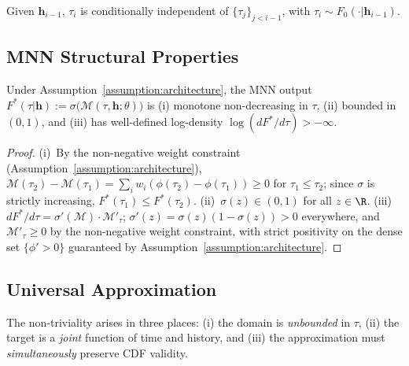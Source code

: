 \begin{assumption}
\label{assumption:conditional_independence}
Given $\boldsymbol{h}_{i-1}$, $\tau_i$ is conditionally independent of
$\{\tau_j\}_{j < i-1}$, with $\tau_i \sim F_0(\cdot|\boldsymbol{h}_{i-1})$.
\end{assumption}

\subsection{MNN Structural Properties}

\begin{theorem}
\label{thm:mnn-mono}
Under Assumption~\ref{assumption:architecture}, the MNN output
$F^*(\tau|\boldsymbol{h}) := \sigma\!\bigl(\mathcal{M}(\tau,\boldsymbol{h};\theta)\bigr)$
is (i) monotone non-decreasing in $\tau$, (ii) bounded in $(0,1)$, and
(iii) has well-defined log-density $\log(dF^*/d\tau) > -\infty$.
\end{theorem}

\begin{proof}
(i)~By the non-negative weight constraint (Assumption~\ref{assumption:architecture}),
$\mathcal{M}(\tau_2)-\mathcal{M}(\tau_1) = \sum_i w_i(\phi(\tau_2)-\phi(\tau_1)) \geq 0$
for $\tau_1 \leq \tau_2$; since $\sigma$ is strictly increasing, $F^*(\tau_1)\leq F^*(\tau_2)$.
(ii)~$\sigma(z)\in(0,1)$ for all $z\in\R$.
(iii)~$dF^*/d\tau = \sigma'(\mathcal{M})\cdot\mathcal{M}'_\tau$;
$\sigma'(z) = \sigma(z)(1-\sigma(z)) > 0$ everywhere, and
$\mathcal{M}'_\tau \geq 0$ by the non-negative weight constraint,
with strict positivity on the dense set $\{\phi'>0\}$ guaranteed by
Assumption~\ref{assumption:architecture}.
\end{proof}

\subsection{Universal Approximation}

The non-triviality arises in three places: (i) the domain is \emph{unbounded}
in $\tau$, (ii) the target is a \emph{joint} function of time and history,
and (iii) the approximation must \emph{simultaneously} preserve CDF validity.

